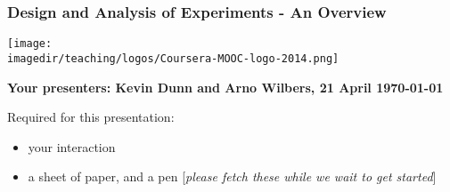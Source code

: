 \documentclass[11pt,aspectratio=169,mathserif]{beamer}
\title[]{\LARGE \color{blue}{Design and Analysis of Experiments - An Overview}}
\subtitle[]{\vspace{0.5cm} \texttt{[image: \\imagedir/teaching/logos/Coursera-MOOC-logo-2014.png]} \vspace{-1.5cm} }\author[]{}
\institute[]{}
\date[]{Kevin Dunn\\ \vspace{1cm}
}
\begin{document}
\begin{frame}\frametitle{\LARGE Design and Analysis of Experiments - An Overview }
	
	
	\vspace{0.25cm} 

	\centerline{\texttt{[image: \\imagedir/teaching/logos/Coursera-MOOC-logo-2014.png]}}

	\vspace{0.5cm}

	\textbf{Your presenters: Kevin Dunn and Arno Wilbers, 21 April \today} \\ 

	\vspace{0.5cm}	
	\begin{exampleblock}{}
		Required for this presentation:
		\begin{itemize}
			\item	your interaction 
			\item	a sheet of paper, and a pen [\emph{please fetch these while we wait to get started}]
		\end{itemize}
	\end{exampleblock}

		
\end{frame}


\end{document}
